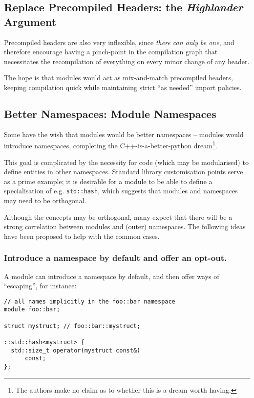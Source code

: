 \documentclass[reqno]{article}
\begin{document}
\subsection{Replace Precompiled Headers: the \emph{Highlander} Argument}

Precompiled headers are also very inflexible, since \emph{there can only be
one}, and therefore encourage having a pinch-point in the compilation graph
that necessitates the recompilation of everything on every minor change of any
header.

The hope is that modules would act as mix-and-match precompiled headers,
keeping compilation quick while maintaining strict ``as needed'' import policies.


\subsection{Better Namespaces: Module Namespaces}

Some have the wish that modules would be better namespaces -- modules would
introduce namespaces, completing the C++-is-a-better-python dream\footnote{The
authors make no claim as to whether this is a dream worth having.}.

This goal is complicated by the necessity for code (which may be modularised)
to define entities in other namespaces. Standard library customisation points
serve as a prime example; it is desirable for a module to be able to define a
specialisation of e.g. \texttt{std::hash}, which suggests that modules and
namespaces may need to be orthogonal.

Although the concepts may be orthogonal, many expect that there will be a
strong correlation between modules and (outer) namespaces. The following ideas
have been proposed to help with the common cases.


\subsubsection{Introduce a namespace by default and offer an opt-out.}

A module can introduce a namespace by default, and then offer ways of
``escaping'', for instance:

\begin{verbatim}
// all names implicitly in the foo::bar namespace
module foo::bar;

struct mystruct; // foo::bar::mystruct;

::std::hash<mystruct> {
  std::size_t operator(mystruct const&)
      const;
};
\end{verbatim}
\end{document}
